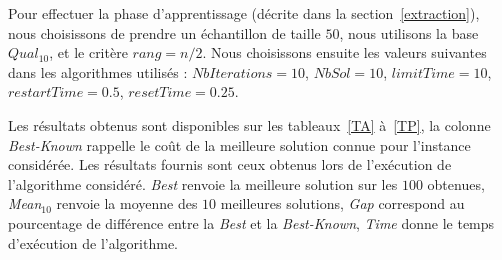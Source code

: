 \documentclass[a4paper,11pt]{article}%
\begin{document}
Pour effectuer la phase d'apprentissage (décrite dans la section~\ref{extraction}), nous choisissons de prendre un échantillon de taille $50$, nous utilisons la base $Qual_{10}$, et le critère $ rang = n/2$. Nous choisissons ensuite les valeurs suivantes dans les algorithmes utilisés : $ NbIterations = 10$, $NbSol = 10$, $limitTime = 10$, $restartTime = 0.5$, $resetTime = 0.25$.

Les résultats obtenus sont disponibles sur les tableaux~\ref{TA} à~\ref{TP}, la colonne \emph{Best-Known} rappelle le coût de la meilleure solution connue pour l'instance considérée. 
Les résultats fournis sont ceux obtenus lors de l'exécution de l'algorithme considéré.
\emph{Best} renvoie la meilleure solution sur les $100$ obtenues, \emph{Mean$_{10}$} renvoie la moyenne des $10$ meilleures solutions, \emph{Gap} correspond au pourcentage de différence entre la \emph{Best} et la \emph{Best-Known}, \emph{Time} donne le temps d'exécution de l'algorithme.
\end{document}
